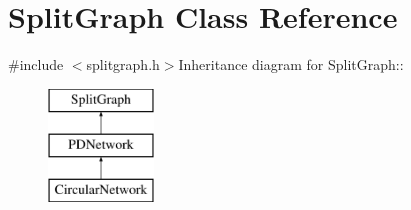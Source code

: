 \hypertarget{classSplitGraph}{
\section{SplitGraph Class Reference}
\label{classSplitGraph}
}


{\ttfamily \#include $<$splitgraph.h$>$}Inheritance diagram for SplitGraph::\begin{figure}[H]
\begin{center}
\leavevmode
\includegraphics[height=3cm]{classSplitGraph}
\end{center}
\end{figure}
